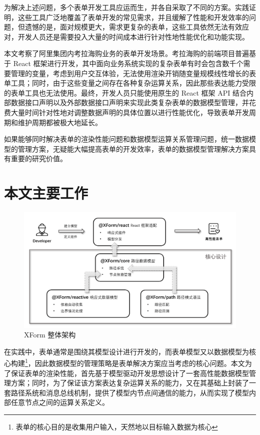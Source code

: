\documentclass[winfonts,master,twoside]{njuthesis}
\begin{document}
为解决上述问题，多个表单开发工具应运而生，并各自采取了不同的方案。实践证明，这些工具广泛地覆盖了表单开发的常见需求，并且缓解了性能和开发效率的问题，但遗憾的是，面对规模更大，需求更复杂的表单，这些工具依然无法有效应对，开发人员还是需要投入大量的时间成本进行针对性地性能优化和功能实现。

本文考察了阿里集团内考拉海购业务的表单开发场景。考拉海购的前端项目普遍基于 React 框架进行开发，其中面向业务系统实现的复杂表单有时会包含数千个需要管理的变量，考虑到用户交互体验，无法使用渲染开销随变量规模线性增长的表单工具；同时，由于这些变量之间存在各种复杂运算关系，因此那些表达能力受限的表单工具也无法使用。最终，开发人员只能使用原生的 React 框架 API 结合内部数据接口声明以及外部数据接口声明来实现此类复杂表单的数据模型管理，并花费大量时间针对性地对调整数据声明的具体位置以进行性能优化，导致表单开发周期和维护周期都被极大地延长。

如果能够同时解决表单的渲染性能问题和数据模型运算关系管理问题，统一数据模型的管理方案，无疑能大幅提高表单的开发效率，表单的数据模型管理解决方案具有重要的研究价值。

\section{本文主要工作}

\begin{figure}[h]
    \centering
    \includegraphics[width=\textwidth]{figure/overview.png}
    \caption{XForm 整体架构}
    \label{overview}
\end{figure}

在实践中，表单通常是围绕其模型设计进行开发的，而表单模型又以数据模型为核心构建\footnote{表单的核心目的是收集用户输入，天然地以目标输入数据为核心}，因此数据模型的管理策略是表单解决方案应当考虑的核心问题。本文为了保证表单的渲染性能，首先基于模型驱动开发思想\cite{selic2003pragmatics}\cite{pastor2008model}设计了一套高性能数据模型管理方案；同时，为了保证该方案表达复杂运算关系的能力，又在其基础上封装了一套路径系统和消息总线机制，提供了模型内节点间通信的能力，从而实现了模型内部任意节点之间的运算关系定义。
\end{document}
